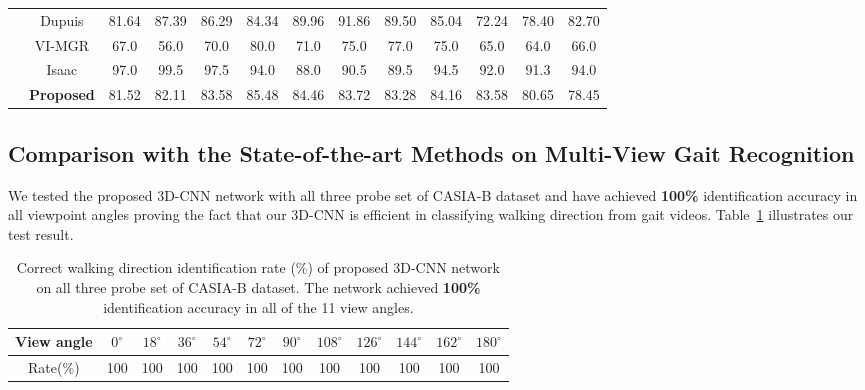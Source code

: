 \begin{table}
{\begin{tabular*}{\textwidth}{|c|c|cccc cccc ccc|}
		\multirow{4}{*}{\rotatebox{90}{Coat}} &Dupuis &81.64 &87.39 &86.29 &84.34 &89.96 &91.86 &89.50 &85.04 &72.24 &78.40 &82.70\\\rule{0pt}{3ex}
		
		&VI-MGR &67.0 &56.0 &70.0 &80.0 &71.0 &75.0 &77.0 &75.0 &65.0 &64.0 &66.0 \\\rule{0pt}{3ex}
		
		&Isaac &97.0 &99.5 &97.5 &94.0 &88.0 &90.5 &89.5 &94.5 &92.0 &91.3 &94.0 \\\rule{0pt}{3ex}
		
		&\textbf{Proposed} &81.52 &82.11 &83.58 &85.48 &84.46 &83.72 &83.28 &84.16 &83.58 &80.65 &78.45 \\\cline{1-13}
\end{tabular*}}{} 
\end{table}


\subsection{Comparison with the State-of-the-art Methods on Multi-View Gait Recognition}
We tested the proposed 3D-CNN network with all three probe set of CASIA-B dataset and have achieved \textbf{100\%} identification accuracy in all viewpoint angles proving the fact that our 3D-CNN is efficient in classifying walking direction from gait videos. Table~\ref{table:result_wd_identification} illustrates our test result. 


\begin{table}[t]
	\centering
	\caption[Correct walking direction identification rate (\%) of proposed 3D-CNN network on all three probe set of CASIA-B dataset]
	{Correct walking direction identification rate (\%) of proposed 3D-CNN network on all three probe set of CASIA-B dataset. The network achieved \textbf{100\%} identification accuracy in all of the 11 view angles. \label{table:result_wd_identification}}
	
	{\begin{tabular*}{35pc}{cccc cccc cccc}\hline \noalign{\smallskip}
			View angle &${0^{\circ}}$	&${18^{\circ}}$  &${36^{\circ}}$ &${54^{\circ}}$	&${72^{\circ}}$	&${90^{\circ}}$	&${108^{\circ}}$ &${126^{\circ}}$ &${144^{\circ}}$ &${162^{\circ}}$  &${180^{\circ}}$ \\\hline \noalign{\smallskip}
			
			Rate(\%) &100 &100 &100 &100 &100 &100 &100 &100 &100 &100 &100 \\ \hline
	\end{tabular*}}{}
\end{table}

